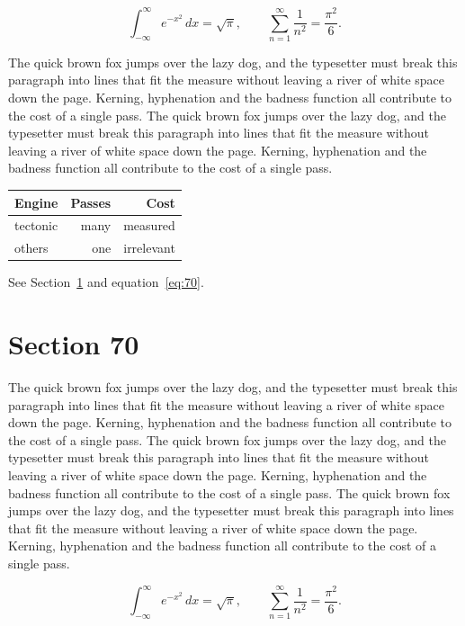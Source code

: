 \documentclass{article}
\begin{document}
\begin{equation}\label{eq:69}
\int_{-\infty}^{\infty} e^{-x^{2}}\,dx = \sqrt{\pi}, \qquad
\sum_{n=1}^{\infty} \frac{1}{n^{2}} = \frac{\pi^{2}}{6}.
\end{equation}

The quick brown fox jumps over the lazy dog, and the typesetter must break this paragraph into lines that fit the measure without leaving a river of white space down the page. Kerning, hyphenation and the badness function all contribute to the cost of a single pass. The quick brown fox jumps over the lazy dog, and the typesetter must break this paragraph into lines that fit the measure without leaving a river of white space down the page. Kerning, hyphenation and the badness function all contribute to the cost of a single pass. 

\begin{center}
\begin{tabular}{lrr}
\toprule
Engine & Passes & Cost \\
\midrule
tectonic & many & measured \\
others & one & irrelevant \\
\bottomrule
\end{tabular}
\end{center}

See Section~\ref{sec:70} and equation~\eqref{eq:70}.
\section{Section 70}
\label{sec:70}
The quick brown fox jumps over the lazy dog, and the typesetter must break this paragraph into lines that fit the measure without leaving a river of white space down the page. Kerning, hyphenation and the badness function all contribute to the cost of a single pass. The quick brown fox jumps over the lazy dog, and the typesetter must break this paragraph into lines that fit the measure without leaving a river of white space down the page. Kerning, hyphenation and the badness function all contribute to the cost of a single pass. The quick brown fox jumps over the lazy dog, and the typesetter must break this paragraph into lines that fit the measure without leaving a river of white space down the page. Kerning, hyphenation and the badness function all contribute to the cost of a single pass. 

\begin{equation}\label{eq:70}
\int_{-\infty}^{\infty} e^{-x^{2}}\,dx = \sqrt{\pi}, \qquad
\sum_{n=1}^{\infty} \frac{1}{n^{2}} = \frac{\pi^{2}}{6}.
\end{equation}
\end{document}
